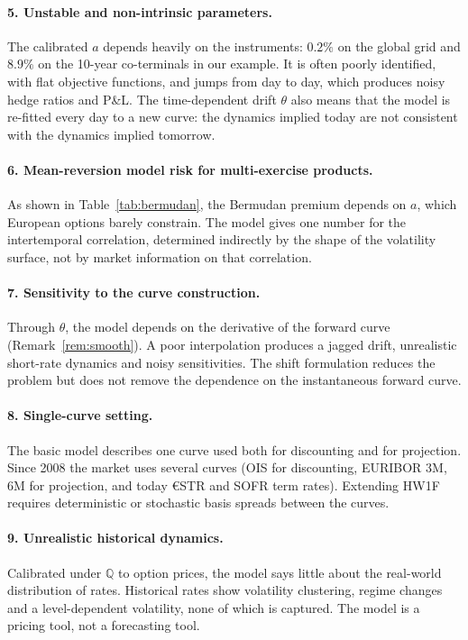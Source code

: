 \documentclass[11pt,a4paper]{article}
\theoremstyle{plain}
\theoremstyle{definition}
\newcommand{\Q}{\mathbb{Q}}
\begin{document}
\paragraph{5. Unstable and non-intrinsic parameters.} The calibrated $a$ depends heavily on the instruments: $0.2\%$ on the global grid and $8.9\%$ on the 10-year co-terminals in our example. It is often poorly identified, with flat objective functions, and jumps from day to day, which produces noisy hedge ratios and P\&L. The time-dependent drift $\theta$ also means that the model is re-fitted every day to a new curve: the dynamics implied today are not consistent with the dynamics implied tomorrow.

\paragraph{6. Mean-reversion model risk for multi-exercise products.} As shown in Table~\ref{tab:bermudan}, the Bermudan premium depends on $a$, which European options barely constrain. The model gives one number for the intertemporal correlation, determined indirectly by the shape of the volatility surface, not by market information on that correlation.

\paragraph{7. Sensitivity to the curve construction.} Through $\theta$, the model depends on the derivative of the forward curve (Remark~\ref{rem:smooth}). A poor interpolation produces a jagged drift, unrealistic short-rate dynamics and noisy sensitivities. The shift formulation reduces the problem but does not remove the dependence on the instantaneous forward curve.

\paragraph{8. Single-curve setting.} The basic model describes one curve used both for discounting and for projection. Since 2008 the market uses several curves (OIS for discounting, EURIBOR 3M, 6M for projection, and today €STR and SOFR term rates). Extending HW1F requires deterministic or stochastic basis spreads between the curves.

\paragraph{9. Unrealistic historical dynamics.} Calibrated under $\Q$ to option prices, the model says little about the real-world distribution of rates. Historical rates show volatility clustering, regime changes and a level-dependent volatility, none of which is captured. The model is a pricing tool, not a forecasting tool.
\end{document}
